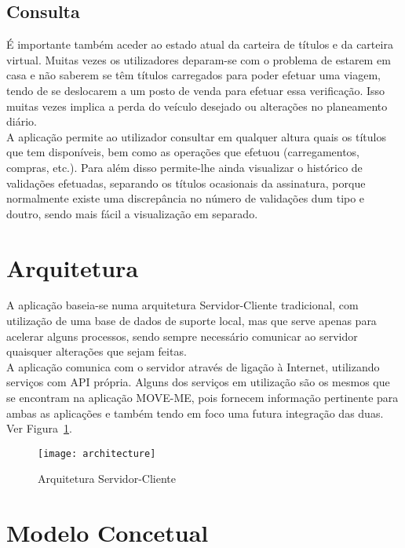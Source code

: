 \subsection{Consulta}

É importante também aceder ao estado atual da carteira de títulos e da carteira virtual. Muitas vezes os utilizadores deparam-se com o problema de estarem em casa e não saberem se têm títulos carregados para poder efetuar uma viagem, tendo de se deslocarem a um posto de venda para efetuar essa verificação. Isso muitas vezes implica a perda do veículo desejado ou alterações no planeamento diário.
\\A aplicação permite ao utilizador consultar em qualquer altura quais os títulos que tem disponíveis, bem como as operações que efetuou (carregamentos, compras, etc.). Para além disso permite-lhe ainda visualizar o histórico de validações efetuadas, separando os títulos ocasionais da assinatura, porque normalmente existe uma discrepância no número de validações dum tipo e doutro, sendo mais fácil a visualização em separado.

\section{Arquitetura}

A aplicação baseia-se numa arquitetura Servidor-Cliente tradicional, com utilização de uma base de dados de suporte local, mas que serve apenas para acelerar alguns processos, sendo sempre necessário comunicar ao servidor quaisquer alterações que sejam feitas.
\\A aplicação comunica com o servidor através de ligação à Internet, utilizando serviços \web com API própria. Alguns dos serviços em utilização são os mesmos que se encontram na aplicação MOVE-ME, pois fornecem informação pertinente para ambas as aplicações e também tendo em foco uma futura integração das duas. Ver Figura~\ref{fig:architecture}.

\begin{figure}[t]
  \begin{center}
    \leavevmode
    \texttt{[image: architecture]}
    \caption{Arquitetura Servidor-Cliente}
    \label{fig:architecture}
  \end{center}
\end{figure}

\section{Modelo Concetual}

